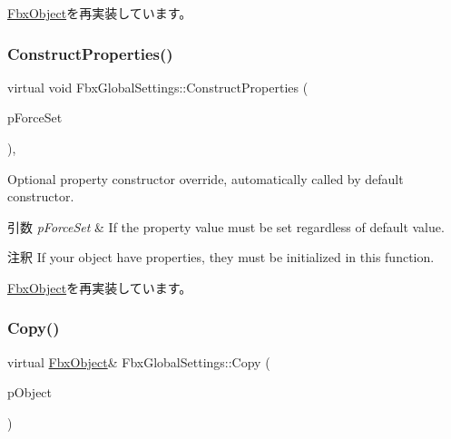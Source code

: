 \hyperlink{class_fbx_object_a313503bc645af3fdceb4a99ef5cea7eb}{Fbx\+Object}を再実装しています。

\mbox{\label{class_fbx_global_settings_a68f3fbfa989be5e5f37040c7a780232b}} 
\subsubsection{\texorpdfstring{Construct\+Properties()}{ConstructProperties()}}
{\footnotesize\ttfamily virtual void Fbx\+Global\+Settings\+::\+Construct\+Properties (\begin{DoxyParamCaption}\item[{bool}]{p\+Force\+Set }\end{DoxyParamCaption})\hspace{0.3cm}{\ttfamily [protected]}, {\ttfamily [virtual]}}

Optional property constructor override, automatically called by default constructor. 
\begin{DoxyParams}{引数}
{\em p\+Force\+Set} & If the property value must be set regardless of default value. \\
\hline
\end{DoxyParams}
\begin{DoxyRemark}{注釈}
If your object have properties, they must be initialized in this function. 
\end{DoxyRemark}


\hyperlink{class_fbx_object_ad44f814323dc1b5e78bff1bfc608b4bb}{Fbx\+Object}を再実装しています。

\mbox{\label{class_fbx_global_settings_aa44ceae4a448e0abd0b17b869f328e2f}} 
\subsubsection{\texorpdfstring{Copy()}{Copy()}}
{\footnotesize\ttfamily virtual \hyperlink{class_fbx_object}{Fbx\+Object}\& Fbx\+Global\+Settings\+::\+Copy (\begin{DoxyParamCaption}\item[{const \hyperlink{class_fbx_object}{Fbx\+Object} \&}]{p\+Object }\end{DoxyParamCaption})\hspace{0.3cm}{\ttfamily [virtual]}}


